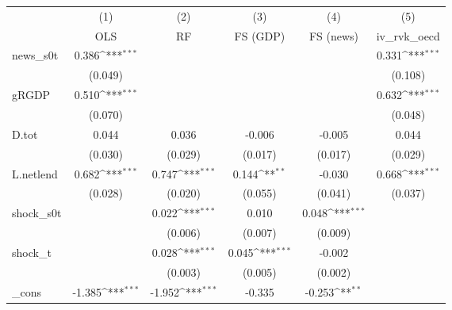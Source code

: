 {
\def\sym#1{\ifmmode^{#1}\else\(^{#1}\)\fi}
\begin{tabular}{l*{5}{c}}
\toprule
            &\multicolumn{1}{c}{(1)}&\multicolumn{1}{c}{(2)}&\multicolumn{1}{c}{(3)}&\multicolumn{1}{c}{(4)}&\multicolumn{1}{c}{(5)}\\
            &\multicolumn{1}{c}{OLS}&\multicolumn{1}{c}{RF}&\multicolumn{1}{c}{FS (GDP)}&\multicolumn{1}{c}{FS (news)}&\multicolumn{1}{c}{iv\_rvk\_oecd}\\
\midrule
news\_s0t    &       0.386\sym{***}&                     &                     &                     &       0.331\sym{***}\\
            &     (0.049)         &                     &                     &                     &     (0.108)         \\
\addlinespace
gRGDP       &       0.510\sym{***}&                     &                     &                     &       0.632\sym{***}\\
            &     (0.070)         &                     &                     &                     &     (0.048)         \\
\addlinespace
D.tot       &       0.044         &       0.036         &      -0.006         &      -0.005         &       0.044         \\
            &     (0.030)         &     (0.029)         &     (0.017)         &     (0.017)         &     (0.029)         \\
\addlinespace
L.netlend   &       0.682\sym{***}&       0.747\sym{***}&       0.144\sym{**} &      -0.030         &       0.668\sym{***}\\
            &     (0.028)         &     (0.020)         &     (0.055)         &     (0.041)         &     (0.037)         \\
\addlinespace
shock\_s0t   &                     &       0.022\sym{***}&       0.010         &       0.048\sym{***}&                     \\
            &                     &     (0.006)         &     (0.007)         &     (0.009)         &                     \\
\addlinespace
shock\_t     &                     &       0.028\sym{***}&       0.045\sym{***}&      -0.002         &                     \\
            &                     &     (0.003)         &     (0.005)         &     (0.002)         &                     \\
\addlinespace
\_cons      &      -1.385\sym{***}&      -1.952\sym{***}&      -0.335         &      -0.253\sym{**} &                     \\

\end{tabular}}
